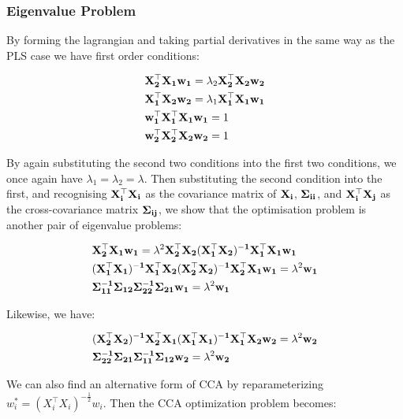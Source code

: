 \subsubsection{Eigenvalue Problem}

By forming the lagrangian and taking partial derivatives in the same way as the PLS case we have first order conditions:

\begin{align}\label{CCA:FOCs}
    & \bold{X_2^{\top}X_1w_1}=\lambda_2 \bold{X_2^{\top}X_2w_2}\\
    & \bold{X_1^{\top}X_2w_2}=\lambda_1 \bold{X_1^{\top}X_1w_1}\\
    & \bold{w_1^{\top}X_1^{\top}X_1w_1}=1\\
    & \bold{w_2^{\top}X_2^{\top}X_2w_2}=1 
\end{align}

By again substituting the second two conditions into the first two conditions, we once again have $\lambda_1=\lambda_2=\lambda$. Then substituting the second condition into the first, and recognising $\bold{X_i^{\top}X_i}$ as the covariance matrix of $\bold{X_i}$, $\bold{\Sigma_{ii}}$, and $\bold{X_i^{\top}X_j}$ as the cross-covariance matrix $\bold{\Sigma_{ij}}$, we show that the optimisation problem is another pair of eigenvalue problems:

\begin{align}
    & \bold{X_2^{\top}X_1w_1}=\lambda^2\bold{X_2^{\top}X_2(X_1^{\top}X_2)^{-1}X_1^{\top}X_1w_1}\\
    & \bold{(X_1^{\top}X_1)^{-1}X_1^{\top}X_2(X_2^{\top}X_2)^{-1}X_2^{\top}X_1w_1}=\lambda^2\bold{w_1}\notag\\
    & \bold{\Sigma_{11}^{-1}\Sigma_{12}\Sigma_{22}^{-1}\Sigma_{21}w_1}=\lambda^2\bold{w_1}\notag\\
\end{align}

Likewise, we have:

\begin{align}
    & \bold{(X_2^{\top}X_2)^{-1}X_2^{\top}X_1(X_1^{\top}X_1)^{-1}X_1^{\top}X_2w_2}=\lambda^2\bold{w_2}\notag\\
    & \bold{\Sigma_{22}^{-1}\Sigma_{21}\Sigma_{11}^{-1}\Sigma_{12}w_2}=\lambda^2\bold{w_2}\notag\\
\end{align}

We can also find an alternative form of CCA by reparameterizing $w^*_i=(X_i^{\top}X_i)^{-\frac{1}{2}}w_i$. Then the CCA optimization problem becomes:

